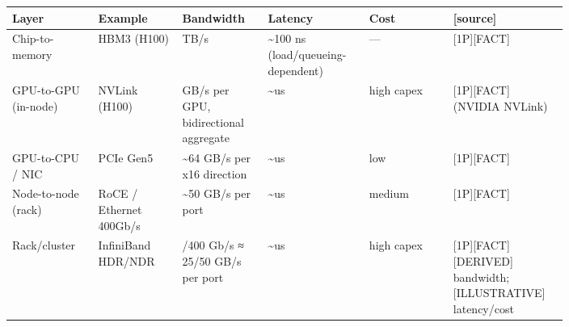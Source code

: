 \nopagebreak[4]
\begin{longtable}[]{@{}
  >{\raggedright\arraybackslash}p{0.1327\linewidth}
  >{\raggedright\arraybackslash}p{0.1327\linewidth}
  >{\raggedright\arraybackslash}p{0.1327\linewidth}
  >{\raggedright\arraybackslash}p{0.1327\linewidth}
  >{\raggedright\arraybackslash}p{0.1327\linewidth}
  >{\raggedright\arraybackslash}p{0.1327\linewidth}@{}}
\toprule\noalign{}
\begin{minipage}[b]{\linewidth}\raggedright
Layer
\end{minipage} & \begin{minipage}[b]{\linewidth}\raggedright
Example
\end{minipage} & \begin{minipage}[b]{\linewidth}\raggedright
Bandwidth
\end{minipage} & \begin{minipage}[b]{\linewidth}\raggedright
Latency
\end{minipage} & \begin{minipage}[b]{\linewidth}\raggedright
Cost
\end{minipage} & \begin{minipage}[b]{\linewidth}\raggedright
\mbox{{[}source{]}}
\end{minipage} \\
\midrule\noalign{}
\endhead
\bottomrule\noalign{}
\endlastfoot
Chip-to-memory & HBM3 (H100) & 3.35 TB/s & \textasciitilde100 ns
(load/queueing-dependent) & --- & \mbox{{[}1P{]}}\hspace{0pt}\mbox{{[}FACT{]}} \\
\noalign{\label{tab:9.1}}
GPU-to-GPU (in-node) & NVLink (H100) & 900 GB/s per GPU, bidirectional
aggregate & \textasciitilde us & high capex & \mbox{{[}1P{]}}\hspace{0pt}\mbox{{[}FACT{]}} (NVIDIA
NVLink) \\
GPU-to-CPU / NIC & PCIe Gen5 & \textasciitilde64 GB/s per x16 direction
& \textasciitilde us & low & \mbox{{[}1P{]}}\hspace{0pt}\mbox{{[}FACT{]}} \\
Node-to-node (rack) & RoCE / Ethernet 400Gb/s & \textasciitilde50 GB/s
per port & \textasciitilde us & medium & \mbox{{[}1P{]}}\hspace{0pt}\mbox{{[}FACT{]}} \\
Rack/cluster & InfiniBand HDR/NDR & 200/400 Gb/s ≈ 25/50 GB/s per port &
\textasciitilde us & high capex & \mbox{{[}1P{]}}\hspace{0pt}\mbox{{[}FACT{]}}\hspace{0pt}\mbox{{[}DERIVED{]}}
bandwidth; \mbox{{[}ILLUSTRATIVE{]}} latency/cost \\
\end{longtable}

